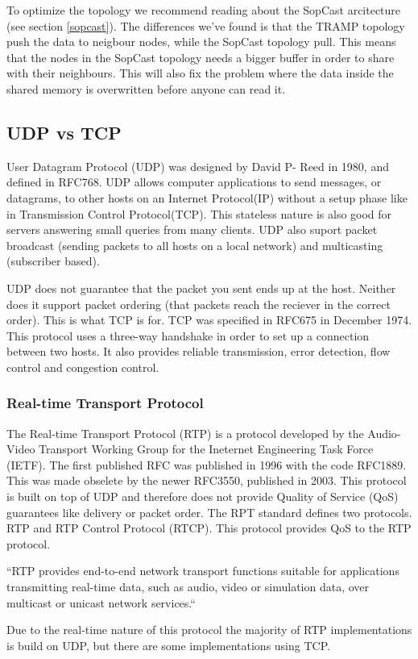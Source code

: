 To optimize the topology we recommend reading about the SopCast arcitecture (see section \ref{sopcast}). The differences we've found is that the TRAMP topology push the data to neigbour nodes, while the SopCast topology pull. This means that the nodes in the SopCast topology needs a bigger buffer in order to share with their neighbours. This will also fix the problem where the data inside the shared memory is overwritten before anyone can read it.

\subsection{UDP vs TCP}
User Datagram Protocol (UDP) was designed by David P- Reed in 1980, and defined in RFC768. UDP allows computer applications to send messages, or datagrams, to other hosts on an Internet Protocol(IP) without a setup phase like in Transmission Control Protocol(TCP). This stateless nature is also good for servers answering small queries from many clients. UDP also suport packet broadcast (sending packets to all hosts on a local network) and multicasting (subscriber based).

UDP does not guarantee that the packet you sent ends up at the host. Neither does it support packet ordering (that packets reach the reciever in the correct order). This is what TCP is for. TCP was specified in RFC675 in December 1974. This protocol uses a three-way handshake in order to set up a connection between two hosts. It also provides reliable transmission, error detection, flow control and congestion control. 

\subsubsection{Real-time Transport Protocol}
The Real-time Transport Protocol (RTP) is a protocol developed by the Audio-Video Transport Working Group for the Ineternet Engineering Task Force (IETF). The first published RFC was published in 1996 with the code RFC1889. This was made obselete by the newer RFC3550, published in 2003\cite{RFC3550}. This protocol is built on top of UDP and therefore does not provide Quality of Service (QoS) guarantees like delivery or packet order. The RPT standard defines two protocols. RTP and RTP Control Protocol (RTCP). This protocol provides QoS to the RTP protocol.

``RTP provides end-to-end network transport functions suitable for applications transmitting real-time data, such as audio, video or simulation data, over multicast or unicast network services.``\cite{RFC3550}

Due to the real-time nature of this protocol the majority of RTP implementations is build on UDP, but there are some implementations using TCP.







